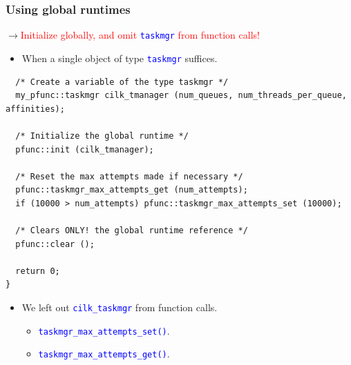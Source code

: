 \documentclass{beamer}
\newcommand{\code}[1]{\lstinline[basicstyle=\sffamily]{#1}}
\newcommand{\func}[1]{\lstinline[basicstyle=\sffamily]{#1()}}
\begin{document}
\begin{frame}[fragile]
\frametitle{Using global runtimes}
$\rightarrow{}$\textcolor{red}{Initialize globally, and omit
\textcolor{blue}{\code{taskmgr}} from function calls!}
\begin{itemize}
\item When a single object of type \textcolor{blue}{\code{taskmgr}} suffices.
\end{itemize}
\begin{center}
\begin{minipage}{0.70\textwidth}
\begin{lstlisting}
  /* Create a variable of the type taskmgr */
  my_pfunc::taskmgr cilk_tmanager (num_queues, num_threads_per_queue, affinities);

  /* Initialize the global runtime */
  pfunc::init (cilk_tmanager);

  /* Reset the max attempts made if necessary */
  pfunc::taskmgr_max_attempts_get (num_attempts);
  if (10000 > num_attempts) pfunc::taskmgr_max_attempts_set (10000);

  /* Clears ONLY! the global runtime reference */
  pfunc::clear ();

  return 0; 
}
\end{lstlisting}
\end{minipage}
\end{center}
\begin{itemize}
\item We left out \textcolor{blue}{\code{cilk_taskmgr}} from function calls.
  \begin{itemize}
  \item \textcolor{blue}{\func{taskmgr_max_attempts_set}}.
  \item \textcolor{blue}{\func{taskmgr_max_attempts_get}}.
  \end{itemize}
\end{itemize}
\end{frame}
\end{document}

